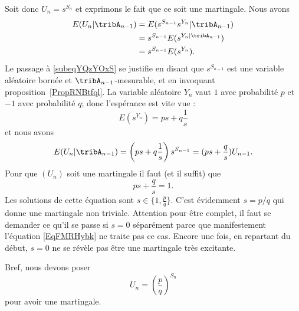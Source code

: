 Soit donc \( U_n=s^{S_n}\) et exprimons le fait que ce soit une martingale. Nous avons
\begin{subequations}
    \begin{align}
        E(U_n|\tribA_{n-1})&=E(s^{S_{n-1}}s^{Y_n}|\tribA_{n-1})\\
        &=s^{S_{n-1}}E(s^{Y_n|\tribA_{n-1}})    \label{subeqYQzYOxS}\\
        &=s^{S_{n-1}}E(s^{Y_n}).
    \end{align}
\end{subequations}
Le passage à \eqref{subeqYQzYOxS} se justifie en disant que \( s^{S_{n-1}}\) est une variable aléatoire bornée et \( \tribA_{n-1}\)-mesurable, et en invoquant proposition~\ref{PropRNBtfql}. La variable aléatoire \( Y_n\) vaut \( 1\) avec probabilité \( p\) et \( -1\) avec probabilité \( q\); donc l'espérance est vite vue :
\begin{equation}
    E(s^{Y_n})=ps+q\frac{1}{ s }
\end{equation}
et nous avons
\begin{equation}
    E(U_n|\tribA_{n-1})=\left( ps+q\frac{1}{ s } \right)s^{S_{n-1}}=(ps+\frac{ q }{ s })U_{n-1}.
\end{equation}
Pour que \( (U_n)\) soit une martingale il faut (et il suffit) que
\begin{equation}    \label{EqFMRHybk}
    ps+\frac{ q }{ s }=1.
\end{equation}
Les solutions de cette équation sont \( s\in\{ 1,\frac{ p }{ q } \}\). C'est évidemment \( s=p/q\) qui donne une martingale non triviale. Attention pour être complet, il faut se demander ce qu'il se passe si \( s=0\) séparément parce que manifestement l'équation \eqref{EqFMRHybk} ne traite pas ce cas. Encore une fois, en repartant du début, \( s=0\) ne se révèle pas être une martingale très excitante.

Bref, nous devons poser
\begin{equation}
    U_n=\left( \frac{ p }{ q } \right)^{S_n}
\end{equation}
pour avoir une martingale.
